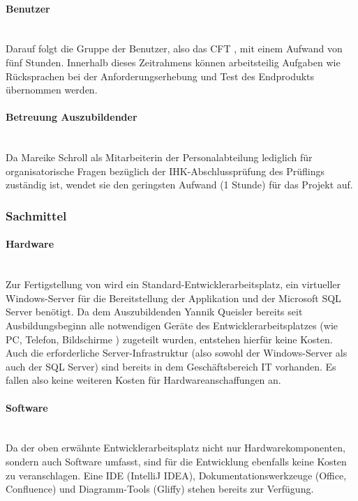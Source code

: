\paragraph{Benutzer} ~\\
\label{p:Benutzer}
Darauf folgt die Gruppe der Benutzer, also das \ac{CFT} \teamName, mit einem Aufwand von fünf Stunden. Innerhalb dieses Zeitrahmens können arbeitsteilig Aufgaben wie Rücksprachen bei der Anforderungserhebung und Test des Endprodukts übernommen werden.

\paragraph{Betreuung Auszubildender} ~\\
\label{p:Betreuung}
Da Mareike Schroll als Mitarbeiterin der Personalabteilung lediglich für organisatorische Fragen bezüglich der IHK-Abschlussprüfung des Prüflings zuständig ist, wendet sie den geringsten Aufwand (1 Stunde) für das Projekt auf.

\subsubsection{Sachmittel}
\label{sec:Sachmittel}

\paragraph{Hardware} ~\\
\label{p:Hardware}
Zur Fertigstellung von \projektName wird ein Standard-Entwicklerarbeitsplatz, ein virtueller Windows-Server für die Bereitstellung der Applikation und der Microsoft SQL Server benötigt. Da dem Auszubildenden Yannik Queisler bereits seit Ausbildungsbeginn alle notwendigen Geräte des Entwicklerarbeitsplatzes (wie PC, Telefon, Bildschirme \etc) zugeteilt wurden, entstehen hierfür keine Kosten. Auch die erforderliche Server-Infrastruktur (also sowohl der Windows-Server als auch der SQL Server) sind bereits in dem Geschäftsbereich IT vorhanden. Es fallen also keine weiteren Kosten für Hardwareanschaffungen an.

\paragraph{Software} ~\\
\label{p:Software}
Da der oben erwähnte Entwicklerarbeitsplatz nicht nur Hardwarekomponenten, sondern auch Software umfasst, sind für die Entwicklung ebenfalls keine Kosten zu veranschlagen. Eine \ac{IDE} (IntelliJ IDEA), Dokumentationswerkzeuge (Office, Confluence) und Diagramm-Tools (Gliffy) stehen bereits zur Verfügung.

